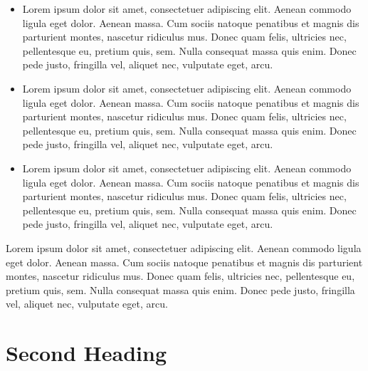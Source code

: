 \documentclass[11pt,a4paper]{scrreprt}
\begin{document}
\begin{itemize}
    \item Lorem ipsum dolor sit amet, consectetuer adipiscing elit. Aenean commodo ligula eget dolor. Aenean massa. Cum sociis natoque penatibus et magnis dis parturient montes, nascetur ridiculus mus. Donec quam felis, ultricies nec, pellentesque eu, pretium quis, sem. Nulla consequat massa quis enim. Donec pede justo, fringilla vel, aliquet nec, vulputate eget, arcu.
    \item Lorem ipsum dolor sit amet, consectetuer adipiscing elit. Aenean commodo ligula eget dolor. Aenean massa. Cum sociis natoque penatibus et magnis dis parturient montes, nascetur ridiculus mus. Donec quam felis, ultricies nec, pellentesque eu, pretium quis, sem. Nulla consequat massa quis enim. Donec pede justo, fringilla vel, aliquet nec, vulputate eget, arcu.
    \item Lorem ipsum dolor sit amet, consectetuer adipiscing elit. Aenean commodo ligula eget dolor. Aenean massa. Cum sociis natoque penatibus et magnis dis parturient montes, nascetur ridiculus mus. Donec quam felis, ultricies nec, pellentesque eu, pretium quis, sem. Nulla consequat massa quis enim. Donec pede justo, fringilla vel, aliquet nec, vulputate eget, arcu.
\end{itemize}
\noindent

Lorem ipsum dolor sit amet, consectetuer adipiscing elit. Aenean commodo ligula eget dolor. Aenean massa. Cum sociis natoque penatibus et magnis dis parturient montes, nascetur ridiculus mus. Donec quam felis, ultricies nec, pellentesque eu, pretium quis, sem. Nulla consequat massa quis enim. Donec pede justo, fringilla vel, aliquet nec, vulputate eget, arcu.

\section{Second Heading}
\end{document}
